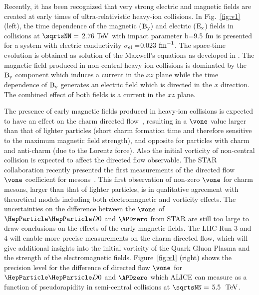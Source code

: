Recently, it has been recognized that very strong electric and magnetic fields are created at early times of ultra-relativistic heavy-ion collisions. In Fig.~\ref{fig:v1} (left), the time dependence of the magnetic ($\rm B_{y}$) and electric ($\rm E_{x}$) fields in \PbPb collisions at $\sqrtsNN=$ 2.76$~\text{TeV}$ with impact parameter b=9.5$~\text{fm}$ is presented for a system with electric
conductivity $\rm \sigma_{el}=$0.023$~\text{fm}^{-1}$. The space-time evolution is obtained as solution of the Maxwell's equations as developed in \cite{Gursoy:2014aka}. The magnetic field produced in non-central heavy ion collisions is dominated by the $\rm B_{y}$ component which induces a current in the $xz$ plane while the time dependence of $\rm B_{y}$ generates an electric field which is directed in the $x$ direction. The combined effect of both fields is a current in the $xz$ plane.

The presence of early magnetic fields produced in heavy-ion collisions is expected to have an effect on the charm directed flow~\cite{Das:2016cwd,Chatterjee:2018lsx,Plumari,Sandeep}, resulting in a $\vone$ value larger than that of lighter particles (short charm formation time and therefore sensitive to the maximum magnetic field strength), and opposite for particles with charm and anti-charm (due to the Lorentz force). Also the initial vorticity of non-central collision is expected to affect the directed flow observable.
The STAR collaboration recently presented the first measurements of the directed flow $\vone$ coefficient for mesons~\cite{Singha}. This first observation of non-zero $\vone$ for charm mesons, larger than that of lighter particles, is in qualitative agreement with theoretical models including both electromagnetic and vorticity effects. The uncertainties on the difference between the $\vone$ of $\PDz$ and $\APDzero$
from STAR are still too large to draw conclusions on the effects of the early magnetic fields.
The LHC Run 3 and 4 will enable more precise measurements on the charm directed flow, which will give additional insights into the initial vorticity of the Quark Gluon Plasma and the strength of the electromagnetic fields. Figure~\ref{fig:v1} (right) shows the precision level for the difference of directed flow $\vone$ for $\PDz$ and $\APDzero$ which ALICE can measure as a function of pseudorapidity in semi-central \PbPb collisions at $\sqrtsNN=$ 5.5 $~\text{TeV}$.

